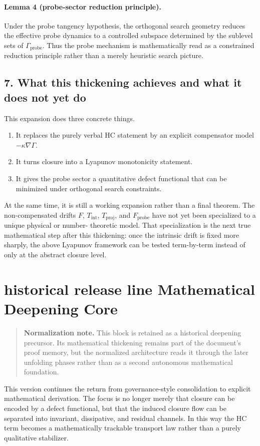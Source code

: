 \documentclass[12pt,a4paper]{article}
\DeclareRobustCommand{\QSCver}[1]{archival stage}
\renewcommand{\QSCver}[1]{historical release line}
\begin{document}
\paragraph{Lemma 4 (probe-sector reduction principle).}
Under the probe tangency hypothesis, the orthogonal search geometry reduces the
effective probe dynamics to a controlled subspace determined by the sublevel
sets of $\Gamma_{\mathrm{probe}}$. Thus the probe mechanism is mathematically read
as a constrained reduction principle rather than a merely heuristic search
picture.

\subsection*{7. What this thickening achieves and what it does not yet do}
This expansion does three concrete things.
\begin{enumerate}
 \item It replaces the purely verbal HC statement by an explicit compensator
 model $-\kappa\nabla\Gamma$.
 \item It turns closure into a Lyapunov monotonicity statement.
 \item It gives the probe sector a quantitative defect functional that can be
 minimized under orthogonal search constraints.
\end{enumerate}
At the same time, it is still a working expansion rather than a final theorem.
The non-compensated drifts $F$, $T_{\mathrm{int}}$, $T_{\mathrm{proj}}$, and
$F_{\mathrm{probe}}$ have not yet been specialized to a unique physical or number-
theoretic model. That specialization is the next true mathematical step after
this thickening: once the intrinsic drift is fixed more sharply, the above
Lyapunov framework can be tested term-by-term instead of only at the abstract
closure level.


\section*{\QSCver{v2.3.0} Mathematical Deepening Core}
\begin{quote}
\textbf{Normalization note.} This block is retained as a historical deepening precursor. Its mathematical thickening remains part of the document's proof memory, but the normalized architecture reads it through the later unfolding phases rather than as a second autonomous mathematical foundation.
\end{quote}

This version continues the return from governance-style consolidation to
explicit mathematical derivation. The focus is no longer merely that closure can
be encoded by a defect functional, but that the induced closure flow can be
separated into invariant, dissipative, and residual channels. In this way the
HC term becomes a mathematically trackable transport law rather than a purely
qualitative stabilizer.
\end{document}
